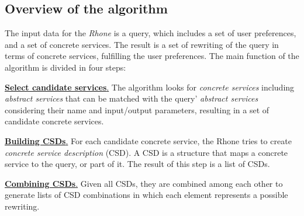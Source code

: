 \subsection{Overview of the algorithm}
The input data for the \textit{Rhone} is a query, which includes a set of user preferences, and a set of concrete services. The result is a set of rewriting of the query in terms of concrete services, fulfilling the user preferences.
The main function of the algorithm is divided in four steps:
%

\noindent \underline{\textbf{Select candidate services}.} The algorithm looks for \textit{concrete services} including \textit{abstract services} that can be matched with the query' \textit{abstract services} considering their name and input/output parameters, resulting in a set of candidate concrete services. 

\noindent \underline{\textbf{Building CSDs}.} For each candidate concrete service, the Rhone tries to create \textit{concrete service description} (CSD). A CSD is a structure that maps a concrete service to the query, or part of it. 
The  result of this step is a list of CSDs.

\noindent \underline{\textbf{Combining CSDs}.} Given all CSDs, they are combined among each other to
generate lists of CSD combinations in which each element represents a possible
rewriting.

